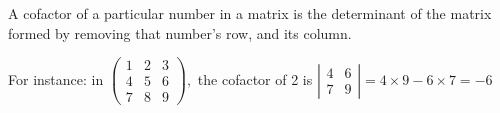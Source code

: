 A cofactor of a particular number in a matrix is the determinant of the matrix
formed by removing that number's row, and its column.
\par
For instance: in 
$ 
\left( 
\begin{array}{ccc}
  1 & 2 & 3 \\
  4 & 5 & 6 \\
  7 & 8 & 9 
\end{array} 
\right), 
$
the cofactor of 2 is 
$ 
\left| 
\begin{array}{cc}
  4 & 6 \\
  7 & 9 
\end{array} 
\right| 
= 4 \times 9 - 6 \times 7 
= -6$